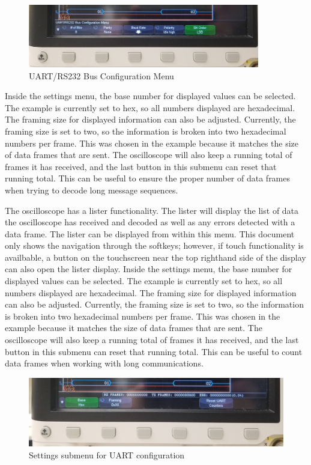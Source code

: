 \documentclass{article}
\begin{document}
  \begin{figure}[h]
    \centering
    \includegraphics[width=0.9\textwidth]{images/uart/bus_config.jpg}
    \caption{UART/RS232 Bus Configuration Menu}
  \end{figure}

  Inside the settings menu, the base number for displayed values can be
  selected. The example is currently set to hex, so all numbers displayed are
  hexadecimal. The framing size for displayed information can also be adjusted.
  Currently, the framing size is set to two, so the information is broken into
  two hexadecimal numbers per frame. This was chosen in the example because it
  matches the size of data frames that are sent. The oscilloscope will also keep
  a running total of frames it has received, and the last button in this submenu
  can reset that running total. This can be useful to ensure the proper number
  of data frames when trying to decode long message sequences.

  The oscilloscope has a lister functionality. The lister will display the list
  of data the oscilloscope has received and decoded as well as any errors
  detected with a data frame. The lister can be displayed from within this menu.
  This document only shows the navigation through the softkeys; however, if
  touch functionality is availbable, a button on the touchscreen near the top
  righthand side of the display can also open the lister display.  Inside the
  settings menu, the base number for displayed values can be selected. The
  example is currently set to hex, so all numbers displayed are hexadecimal. The
  framing size for displayed information can also be adjusted.  Currently, the
  framing size is set to two, so the information is broken into two hexadecimal
  numbers per frame. This was chosen in the example because it matches the size
  of data frames that are sent. The oscilloscope will also keep a running total
  of frames it has received, and the last button in this submenu can reset that
  running total. This can be useful to count data frames when working with long
  communications.

  \begin{figure}[ht]
    \includegraphics[width=\textwidth]{images/uart/uart_settings.jpg}
    \caption{Settings submenu for UART configuration}
  \end{figure}
\end{document}
